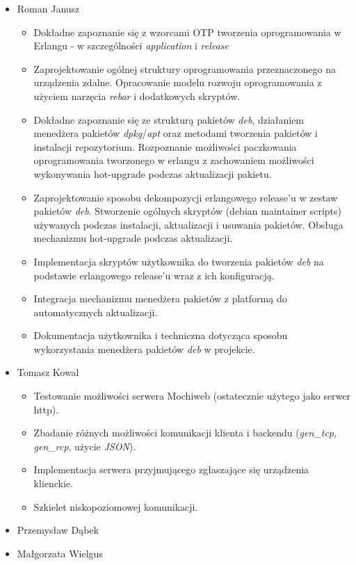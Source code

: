 \documentclass[polish,12pt]{aghthesis} \usepackage[utf8]{inputenc}
\begin{document}
\begin{itemize}
  \item Roman Janusz
  \begin{itemize}
    \item Dokładne zapoznanie się z wzorcami OTP tworzenia oprogramowania w Erlangu - w szczególności \emph{application} i \emph{release}
    \item Zaprojektowanie ogólnej struktury oprogramowania przeznaczonego na urządzenia zdalne. Opracowanie modelu rozwoju oprogramowania z użyciem narzęcia \emph{rebar} i dodatkowych skryptów.
    \item Dokładne zapoznanie się ze strukturą pakietów \emph{deb}, działaniem menedżera pakietów \emph{dpkg}/\emph{apt} oraz metodami tworzenia pakietów i instalacji repozytorium. Rozpoznanie możliwości paczkowania oprogramowania tworzonego w erlangu z zachowaniem możliwości wykonywania hot-upgrade podczas aktualizacji pakietu.
    \item Zaprojektowanie sposobu dekompozycji erlangowego release'u w zestaw pakietów \emph{deb}. Stworzenie ogólnych skryptów (debian maintainer scripts) używanych podczas instalacji, aktualizacji i usuwania pakietów. Obsługa mechanizmu hot-upgrade podczas aktualizacji.
    \item Implementacja skryptów użytkownika do tworzenia pakietów \emph{deb} na podstawie erlangowego release'u wraz z ich konfiguracją.
    \item Integracja mechanizmu menedżera pakietów z platformą do automatycznych aktualizacji.
    \item Dokumentacja użytkownika i techniczna dotycząca sposobu wykorzystania menedżera pakietów \emph{deb} w projekcie.
  \end{itemize}

  \item Tomasz Kowal
  \begin{itemize}
    \item Testowanie możliwości serwera Mochiweb (ostatecznie użytego jako serwer http).
    \item Zbadanie różnych możliwości komunikacji klienta i backendu (\emph{gen\_tcp}, \emph{gen\_rcp}, użycie \emph{JSON}).
    \item Implementacja serwera przyjmującego zgłaszające się urządzenia klienckie.
    \item Szkielet niskopoziomowej komunikacji.
  \end{itemize}
  \item Przemysław Dąbek
  \item Małgorzata Wielgus
\end{itemize}
\end{document}
